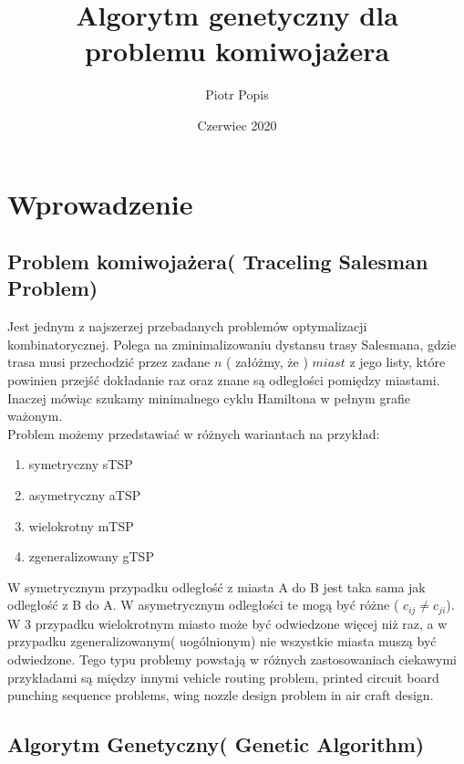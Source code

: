\documentclass[11pt]{article}
\title{Algorytm genetyczny dla \\ problemu komiwojażera}
\author{Piotr Popis}
\date{Czerwiec 2020}
\begin{document}
\begin{titlepage}
\maketitle
\end{titlepage}
\section{Wprowadzenie}
\subsection{Problem komiwojażera( Traceling Salesman Problem)}
Jest jednym z najszerzej przebadanych problemów optymalizacji kombinatorycznej. Polega na zminimalizowaniu dystansu trasy Salesmana, gdzie trasa musi przechodzić przez zadane $n$ ( załóżmy, że ) $miast$ z jego listy, które powinien przejść dokładanie raz oraz znane są odległości pomiędzy miastami. Inaczej mówiąc szukamy minimalnego cyklu Hamiltona w pełnym grafie ważonym.\\
Problem możemy przedstawiać w różnych wariantach na przykład:
\begin{enumerate}
\item symetryczny sTSP
\item asymetryczny aTSP
\item wielokrotny mTSP
\item zgeneralizowany gTSP
\end{enumerate}
W symetrycznym przypadku odległość z miasta A do B jest taka sama jak odległość z B do A. W asymetrycznym odległości te mogą być różne ( $c_{ij} \neq c_{ji}$). W 3 przypadku wielokrotnym miasto może być odwiedzone więcej niż raz, a w przypadku zgeneralizowanym( uogólnionym) nie wszystkie miasta muszą być odwiedzone.
   Tego typu problemy powstają w różnych zastosowaniach ciekawymi przykładami są między innymi vehicle routing problem, printed circuit board punching sequence problems, wing nozzle design problem in air craft design.
\subsection{Algorytm Genetyczny( Genetic Algorithm)}
\end{document}
